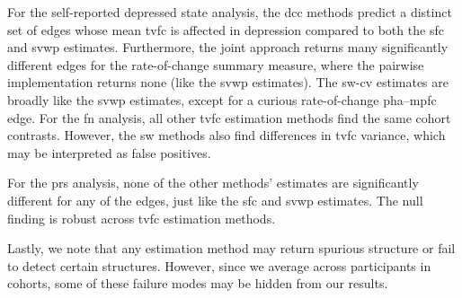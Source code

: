 For the self-reported depressed state analysis, the \gls{dcc} methods predict a distinct set of edges whose mean \gls{tvfc} is affected in depression compared to both the \gls{sfc} and \gls{svwp} estimates.
Furthermore, the joint approach returns many significantly different edges for the rate-of-change summary measure, where the pairwise implementation returns none (like the \gls{svwp} estimates).
The \gls{sw-cv} estimates are broadly like the \gls{svwp} estimates, except for a curious rate-of-change \gls{pha}--\gls{mpfc} edge.
%
For the \gls{fn} analysis, all other \gls{tvfc} estimation methods find the same cohort contrasts.
However, the \gls{sw} methods also find differences in \gls{tvfc} variance, which may be interpreted as false positives.

For the \gls{prs} analysis, none of the other methods' estimates are significantly different for any of the edges, just like the \gls{sfc} and \gls{svwp} estimates.
The null finding is robust across \gls{tvfc} estimation methods.

Lastly, we note that any estimation method may return spurious structure or fail to detect certain structures.
However, since we average across participants in cohorts, some of these failure modes may be hidden from our results.
